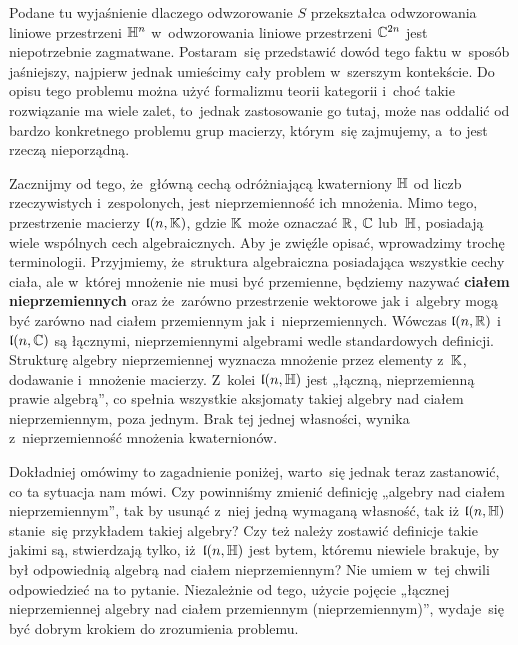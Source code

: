 \documentclass[a4paper,11pt]{article}
\begin{document}
\vspace{\spaceFour}





\start {} Podane tu wyjaśnienie dlaczego odwzorowanie $S$
przekształca odwzorowania liniowe przestrzeni $\mathbb{H}^{ n }$ w~odwzorowania
liniowe przestrzeni $\mathbb{C}^{ 2n }$ jest niepotrzebnie zagmatwane. Postaram~się
przedstawić dowód tego faktu w~sposób jaśniejszy, najpierw jednak
umieścimy cały problem w~szerszym kontekście. Do opisu tego problemu
można użyć formalizmu teorii kategorii i~choć takie rozwiązanie ma wiele
zalet, to~jednak zastosowanie go tutaj, może nas oddalić od bardzo
konkretnego problemu grup macierzy, którym~się zajmujemy, a~to jest rzeczą
nieporządną.

Zacznijmy od tego, że~główną cechą odróżniającą kwaterniony $\mathbb{H}$ od liczb
rzeczywistych i~zespolonych, jest nieprzemienność ich mnożenia. Mimo tego,
przestrzenie macierzy $\mathfrak{l}( n, \mathbb{K} )$, gdzie $\mathbb{K}$ może oznaczać
$\mathbb{R}$, $\mathbb{C}$ lub~$\mathbb{H}$, posiadają wiele wspólnych cech algebraicznych.
Aby je zwięźle opisać, wprowadzimy trochę terminologii. Przyjmiemy,
że~struktura algebraiczna posiadająca wszystkie cechy ciała, ale w~której
mnożenie nie musi być przemienne, będziemy nazywać \textbf{ciałem
  nieprzemiennych} oraz że~zarówno przestrzenie wektorowe jak i~algebry mogą
być zarówno nad ciałem przemiennym jak i~nieprzemiennych. Wówczas
$\mathfrak{l}( n, \mathbb{R} )$ i~$\mathfrak{l}( n, \mathbb{C} )$ są łącznymi, nieprzemiennymi
algebrami wedle standardowych definicji. Strukturę algebry nieprzemiennej
wyznacza mnożenie przez elementy z~$\mathbb{K}$, dodawanie i~mnożenie macierzy.
Z~kolei $\mathfrak{l}( n, \mathbb{H} )$ jest „łączną, nieprzemienną prawie algebrą”, co
spełnia wszystkie aksjomaty takiej algebry nad ciałem nieprzemiennym, poza
jednym. Brak tej jednej własności, wynika z~nieprzemienność mnożenia
kwaternionów.

Dokładniej omówimy to zagadnienie poniżej, warto~się jednak teraz
zastanowić, co ta sytuacja nam mówi. Czy powinniśmy zmienić definicję
„algebry nad ciałem nieprzemiennym”, tak by usunąć z~niej jedną wymaganą
własność, tak iż $\mathfrak{l}( n, \mathbb{H} )$ stanie~się przykładem takiej algebry?
Czy też należy zostawić definicje takie jakimi są, stwierdzają tylko,
iż~$\mathfrak{l}( n, \mathbb{H} )$ jest bytem, któremu niewiele brakuje, by był
odpowiednią algebrą nad ciałem nieprzemiennym? Nie umiem w~tej chwili
odpowiedzieć na to pytanie. Niezależnie od tego, użycie pojęcie „łącznej
nieprzemiennej algebry nad ciałem przemiennym (nieprzemiennym)”, wydaje~się
być dobrym krokiem do zrozumienia problemu.
\end{document}
